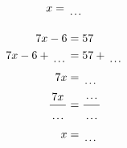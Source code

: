 \documentclass[12pt]{article}
\newcounter{minipagecount}
\begin{document}
\begin{multicols}{2}
\begin{minipage}[t]{0.45\textwidth}
\begin{align*}
        x &= \dotuline{\hspace{5mm}}\\
    \end{align*}
\end{minipage}\columnbreak
\noindent{(\theminipagecount)}\hspace{0.1mm} %
\begin{minipage}[t]{0.45\textwidth} %
    \vspace{-26pt}  %
    \raggedright %
    \begin{align*} %
        7x - 6 &= 57\\
        7x - 6 + \dotuline{\hspace{5mm}} &= 57 + \dotuline{\hspace{5mm}}\\
        7x &= \dotuline{\hspace{5mm}}\\
        \frac{7x}{\dotuline{\hspace{5mm}}} &= \frac{\dotuline{\hspace{5mm}}}{\dotuline{\hspace{5mm}}}\\
        x &= \dotuline{\hspace{5mm}}\\
    \end{align*}
\end{minipage} %
\noindent{(\theminipagecount)}\hspace{0.1mm} %
\begin{minipage}[t]{0.45\textwidth} %
    \vspace{-26pt}  %

\end{minipage}
\end{multicols}
\end{document}
